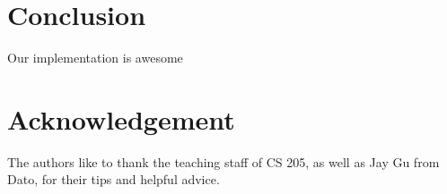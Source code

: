 \section{Conclusion}

Our implementation is awesome

\section*{Acknowledgement}

The authors like to thank the teaching staff of CS 205, as well as Jay Gu from
Dato, for their tips and helpful advice. 
